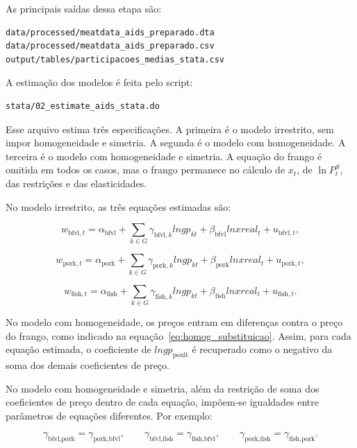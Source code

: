 \documentclass[12pt,a4paper]{article}
\begin{document}
As principais saídas dessa etapa são:

\begin{verbatim}
data/processed/meatdata_aids_preparado.dta
data/processed/meatdata_aids_preparado.csv
output/tables/participacoes_medias_stata.csv
\end{verbatim}

A estimação dos modelos é feita pelo script:

\begin{verbatim}
stata/02_estimate_aids_stata.do
\end{verbatim}

Esse arquivo estima três especificações. A primeira é o modelo irrestrito, sem impor homogeneidade e simetria. A segunda é o modelo com homogeneidade. A terceira é o modelo com homogeneidade e simetria. A equação do frango é omitida em todos os casos, mas o frango permanece no cálculo de \(x_t\), de \(\ln P_t^S\), das restrições e das elasticidades.

No modelo irrestrito, as três equações estimadas são:

\[
w_{\text{bfvl},t}
=
\alpha_{\text{bfvl}}
+
\sum_{k \in G}
\gamma_{\text{bfvl},k}lngp_{kt}
+
\beta_{\text{bfvl}}lnxreal_t
+
u_{\text{bfvl},t},
\tag{40}
\label{eq:eq_bfvl_irrestrita}
\]

\[
w_{\text{pork},t}
=
\alpha_{\text{pork}}
+
\sum_{k \in G}
\gamma_{\text{pork},k}lngp_{kt}
+
\beta_{\text{pork}}lnxreal_t
+
u_{\text{pork},t},
\tag{41}
\label{eq:eq_pork_irrestrita}
\]

\[
w_{\text{fish},t}
=
\alpha_{\text{fish}}
+
\sum_{k \in G}
\gamma_{\text{fish},k}lngp_{kt}
+
\beta_{\text{fish}}lnxreal_t
+
u_{\text{fish},t}.
\tag{42}
\label{eq:eq_fish_irrestrita}
\]

No modelo com homogeneidade, os preços entram em diferenças contra o preço do frango, como indicado na equação~\eqref{eq:homog_substituicao}. Assim, para cada equação estimada, o coeficiente de \(lngp_{\text{poult}}\) é recuperado como o negativo da soma dos demais coeficientes de preço.

No modelo com homogeneidade e simetria, além da restrição de soma dos coeficientes de preço dentro de cada equação, impõem-se igualdades entre parâmetros de equações diferentes. Por exemplo:

\[
\gamma_{\text{bfvl},\text{pork}}
=
\gamma_{\text{pork},\text{bfvl}},
\qquad
\gamma_{\text{bfvl},\text{fish}}
=
\gamma_{\text{fish},\text{bfvl}},
\qquad
\gamma_{\text{pork},\text{fish}}
=
\gamma_{\text{fish},\text{pork}}.
\tag{43}
\label{eq:simetria_estimacao}
\]
\end{document}
